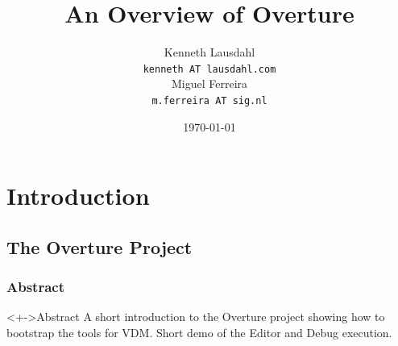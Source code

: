 
\usepackage{pgf}
\usepackage{beamerthemesplit}


\newcommand{\pgl}[1]{Peter Gorm Larsen} 
\newcommand{\mail}[1]{{\small \texttt{#1}}}
\newcommand{\yellow}[1]{{\color{yellow} #1}}
\newcommand{\blue}[1]{{\color{blue} #1}}
\newcommand{\red}[1]{{\color{red} #1}}
\newcommand{\green}[1]{{\color{green} #1}}
\newcommand{\fixin}[1]{\fixme[inline]{\texttt{#1}}} 
\newcommand{\fixfo}[1]{\fixme[footnote]{\texttt{#1}}} 
\newcommand{\fixma}[1]{\fixme[margin]{\texttt{#1}}} 
\newcommand{\from}[1]{%
\noindent%
\begin{flushright}%
    \emph{\footnotesize #1}%
\end{flushright}%
} 


\title{An Overview of Overture}

\author[K. Lausdahl, M. Ferreira]{
  Kenneth Lausdahl \\
  \mail{kenneth AT lausdahl.com} \\
  Miguel Ferreira \\
  \mail{m.ferreira AT sig.nl}
}


\date{\today}



\frame{\titlepage}

\section[Outline]{}
\frame{\tableofcontents}

\section{Introduction}
\subsection{The Overture Project}
\frame
{
  \frametitle{Abstract}

\begin{block}<+->{Abstract}
A short introduction to the Overture project showing how to bootstrap the tools for VDM. Short demo of the Editor and Debug execution.
\end{block}


}


